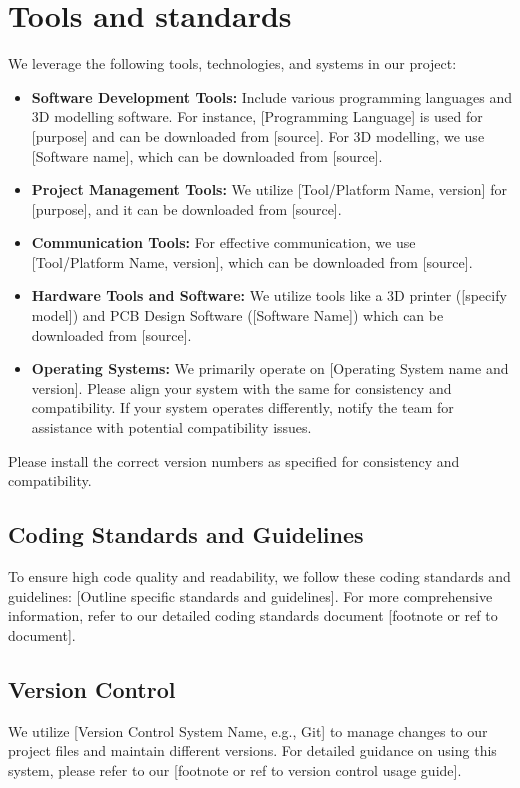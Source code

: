 \documentclass[10pt]{projectdoc}
\begin{document}
\section{Tools and standards}
We leverage the following tools, technologies, and systems in our project:

\begin{itemize}
\item \textbf{Software Development Tools:} Include various programming languages and 3D modelling software. For instance, [Programming Language] is used for [purpose] and can be downloaded from [source]. For 3D modelling, we use [Software name], which can be downloaded from [source].
\item \textbf{Project Management Tools:} We utilize [Tool/Platform Name, version] for [purpose], and it can be downloaded from [source].
\item \textbf{Communication Tools:} For effective communication, we use [Tool/Platform Name, version], which can be downloaded from [source].
\item \textbf{Hardware Tools and Software:} We utilize tools like a 3D printer ([specify model]) and PCB Design Software ([Software Name]) which can be downloaded from [source].
\item \textbf{Operating Systems:} We primarily operate on [Operating System name and version]. Please align your system with the same for consistency and compatibility. If your system operates differently, notify the team for assistance with potential compatibility issues.
\end{itemize}

Please install the correct version numbers as specified for consistency and compatibility.

\subsection{Coding Standards and Guidelines}

To ensure high code quality and readability, we follow these coding standards and guidelines: [Outline specific standards and guidelines]. For more comprehensive information, refer to our detailed coding standards document [footnote or ref to document].

\subsection{Version Control}

We utilize [Version Control System Name, e.g., Git] to manage changes to our project files and maintain different versions. For detailed guidance on using this system, please refer to our [footnote or ref to version control usage guide].
\end{document}
